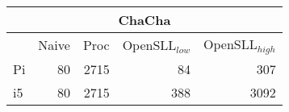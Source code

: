 \begin{frame}
\begin{minipage}[b]{0.55\textwidth}
\begin{tabular}{l r r r r}
\multicolumn{5}{c}{ChaCha}\\
\hline
 & Naive & Proc & OpenSLL$_{low}$ & OpenSLL$_{high}$\\
\hline
Pi & 80 & 2715 & 84 & 307\\
i5 &  80  &  2715    & 388   & 3092
\end{tabular}
\end{minipage}
\end{frame}
